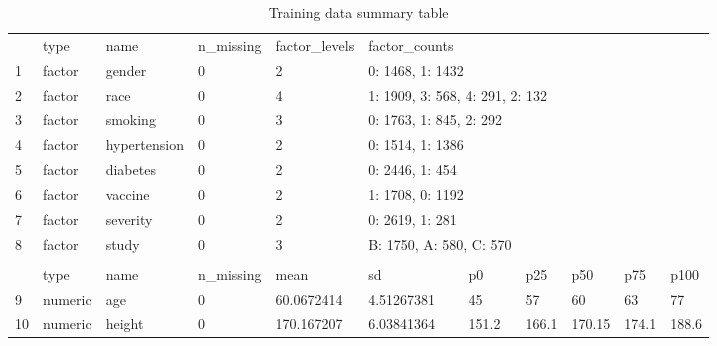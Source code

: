 \documentclass[11pt]{article}
\begin{document}
\begin{table}[]
\small
\centering
\caption{Training data summary table}
\label{tab:datasummary}
\begin{tabular}{lllllllllll}
\cline{1-7}
   & type    & name           & n\_missing & factor\_levels & \multicolumn{2}{l}{factor\_counts}          &         &        &       &       \\ \cline{1-7}
1  & factor  & gender         & 0          & 2              & \multicolumn{2}{l}{0: 1468, 1: 1432}        &         &        &       &       \\
2  & factor  & race           & 0          & 4              & \multicolumn{3}{l}{1: 1909, 3: 568, 4: 291, 2: 132}   &        &       &       \\
3  & factor  & smoking        & 0          & 3              & \multicolumn{2}{l}{0: 1763, 1: 845, 2: 292} &         &        &       &       \\
4  & factor  & hypertension   & 0          & 2              & \multicolumn{2}{l}{0: 1514, 1: 1386}        &         &        &       &       \\
5  & factor  & diabetes       & 0          & 2              & \multicolumn{2}{l}{0: 2446, 1: 454}         &         &        &       &       \\
6  & factor  & vaccine        & 0          & 2              & \multicolumn{2}{l}{1: 1708, 0: 1192}        &         &        &       &       \\
7  & factor  & severity       & 0          & 2              & \multicolumn{2}{l}{0: 2619, 1: 281}         &         &        &       &       \\
8  & factor  & study          & 0          & 3              & \multicolumn{2}{l}{B: 1750, A: 580, C: 570} &         &        &       &       \\ \cline{1-7}
   &         &                &            &                &                         &                   &         &        &       &       \\ \hline
   & type    & name           & n\_missing & mean           & sd                      & p0                & p25     & p50    & p75   & p100  \\ \hline
9  & numeric & age            & 0          & 60.0672414     & 4.51267381              & 45                & 57      & 60     & 63    & 77    \\
10 & numeric & height         & 0          & 170.167207     & 6.03841364              & 151.2             & 166.1   & 170.15 & 174.1 & 188.6 \\

\end{tabular}
\end{table}
\end{document}
